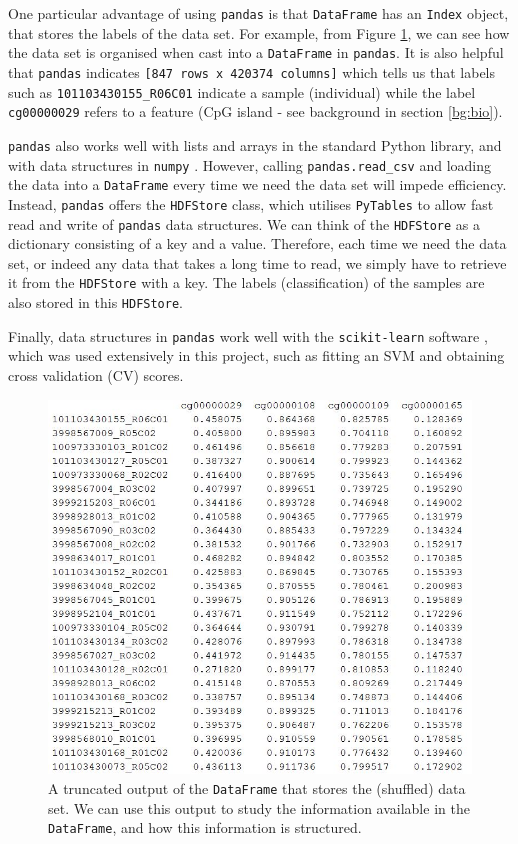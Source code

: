\documentclass[12pt, twoside, a4paper]{report}
\begin{document}
One particular advantage of using \texttt{pandas} is that \texttt{DataFrame} has an \texttt{Index} object, that stores the labels of the data set. For example, from Figure \ref{data:pandas:example}, we can see how the data set is organised when cast into a \texttt{DataFrame} in \texttt{pandas}. It is also helpful that \texttt{pandas} indicates \texttt{[847 rows x 420374 columns]} which tells us that labels such as \texttt{101103430155\_R06C01} indicate a sample (individual) while the label \texttt{cg00000029} refers to a feature (CpG island - see background in section \ref{bg:bio}).

\texttt{pandas} also works well with lists and arrays in the standard Python library, and with data structures in \texttt{numpy} \cite{RefWorks:214}. However, calling \texttt{pandas.read\_csv} and loading the data into a \texttt{DataFrame} every time we need the data set will impede efficiency. Instead, \texttt{pandas} offers the \texttt{HDFStore} class, which utilises \texttt{PyTables} \cite{pytables} to allow fast read and write of \texttt{pandas} data structures. We can think of the \texttt{HDFStore} as a dictionary consisting of a key and a value. Therefore, each time we need the data set, or indeed any data that takes a long time to read, we simply have to retrieve it from the \texttt{HDFStore} with a key. The labels (classification) of the samples are also stored in this \texttt{HDFStore}.

Finally, data structures in  \texttt{pandas} work well with the \texttt{scikit-learn} software \cite{scikit-learn}, which was used extensively in this project, such as fitting an SVM and obtaining cross validation (CV) scores.

\begin{figure}
\centering
\includegraphics[scale=0.75]{images/pandas-example.JPG}
\caption{A truncated output of the \texttt{DataFrame} that stores the (shuffled) data set. We can use this output to study the information available in the \texttt{DataFrame}, and how this information is structured.}
\label{data:pandas:example}
\end{figure}
\end{document}
